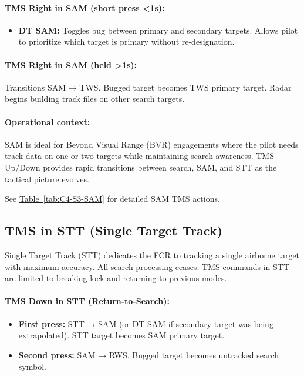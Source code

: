 \documentclass[11pt, a4paper, twoside]{report}
\newcommand{\tabref}[1]{\hyperref[#1]{Table~\ref*{#1}}}
\begin{document}
\paragraph{TMS Right in SAM (short press <1s):}
\begin{itemize}
    \item \textbf{DT SAM:} Toggles bug between primary and secondary targets. Allows pilot to prioritize which target is primary without re-designation.
\end{itemize}

\paragraph{TMS Right in SAM (held >1s):}
Transitions SAM → TWS. Bugged target becomes TWS primary target. Radar begins building track files on other search targets.

\paragraph{Operational context:}
SAM is ideal for Beyond Visual Range (BVR) engagements where the pilot needs track data on one or two targets while maintaining search awareness. TMS Up/Down provides rapid transitions between search, SAM, and STT as the tactical picture evolves.

See \tabref{tab:C4-S3-SAM} for detailed SAM TMS actions.

\subsection{TMS in STT (Single Target Track)}
\label{sec:C4-S3-S2}

Single Target Track (STT) dedicates the FCR to tracking a single airborne target with maximum accuracy. All search processing ceases. TMS commands in STT are limited to breaking lock and returning to previous modes.

\paragraph{TMS Down in STT (Return-to-Search):}
\begin{itemize}
    \item \textbf{First press:} STT → SAM (or DT SAM if secondary target was being extrapolated). STT target becomes SAM primary target.
    \item \textbf{Second press:} SAM → RWS. Bugged target becomes untracked search symbol.
\end{itemize}
\end{document}
